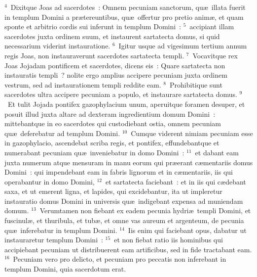 ${}^{4}$~Dixitque Joas ad sacerdotes~: Omnem pecuniam sanctorum, qu\ae\ illata fuerit in templum Domini a pr\ae tereuntibus, qu\ae\ offertur pro pretio anim\ae , et quam sponte et arbitrio cordis sui inferunt in templum Domini~:
${}^{5}$~accipiant illam sacerdotes juxta ordinem suum, et instaurent sartatecta domus, si quid necessarium viderint instauratione.
${}^{6}$~Igitur usque ad vigesimum tertium annum regis Joas, non instauraverunt sacerdotes sartatecta templi.
${}^{7}$~Vocavitque rex Joas Jojadam pontificem et sacerdotes, dicens eis~: Quare sartatecta non instauratis templi~? nolite ergo amplius accipere pecuniam juxta ordinem vestrum, sed ad instaurationem templi reddite eam.
${}^{8}$~Prohibitique sunt sacerdotes ultra accipere pecuniam a populo, et instaurare sartatecta domus.
${}^{9}$~Et tulit Jojada pontifex gazophylacium unum, aperuitque foramen desuper, et posuit illud juxta altare ad dexteram ingredientium domum Domini~: mittebantque in eo sacerdotes qui custodiebant ostia, omnem pecuniam qu\ae\ deferebatur ad templum Domini.
${}^{10}$~Cumque viderent nimiam pecuniam esse in gazophylacio, ascendebat scriba regis, et pontifex, effundebantque et numerabant pecuniam qu\ae\ inveniebatur in domo Domini~:
${}^{11}$~et dabant eam juxta numerum atque mensuram in manu eorum qui pr\ae erant c\ae mentariis domus Domini~: qui impendebant eam in fabris lignorum et in c\ae mentariis, iis qui operabantur in domo Domini,
${}^{12}$~et sartatecta faciebant~: et in iis qui c\ae debant saxa, et ut emerent ligna, et lapides, qui excidebantur, ita ut impleretur instauratio domus Domini in universis qu\ae\ indigebant expensa ad muniendam domum.
${}^{13}$~Verumtamen non fiebant ex eadem pecunia hydri\ae\ templi Domini, et fuscinul\ae , et thuribula, et tub\ae , et omne vas aureum et argenteum, de pecunia qu\ae\ inferebatur in templum Domini.
${}^{14}$~Iis enim qui faciebant opus, dabatur ut instauraretur templum Domini~:
${}^{15}$~et non fiebat ratio iis hominibus qui accipiebant pecuniam ut distribuerent eam artificibus, sed in fide tractabant eam.
${}^{16}$~Pecuniam vero pro delicto, et pecuniam pro peccatis non inferebant in templum Domini, quia sacerdotum erat.


